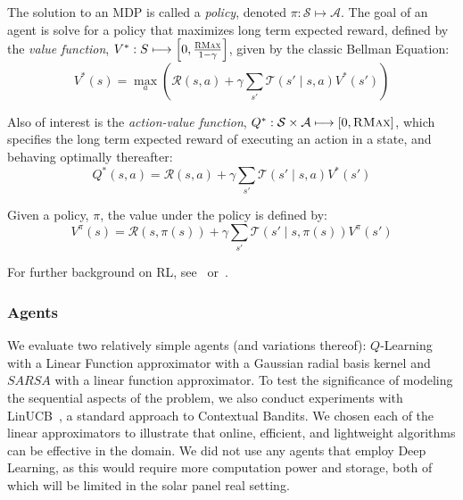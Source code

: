 \documentclass{article}
\newcommand{\mc}{\mathcal}
\begin{document}
{The solution to an MDP is called a {\it policy}, denoted $\pi : \mc{S} \longmapsto \mc{A}$. The goal of an agent is solve for a policy that maximizes long term expected reward, defined by the {\it value function}, $V^* : S \longmapsto \left[0,\frac{\textsc{RMax}}{1-\gamma}\right]$, given by the classic Bellman Equation:
\begin{equation}
V^*(s) = \max_a \left(\mc{R}(s,a) + \gamma \sum_{s'} \mc{T}(s' \mid s, a) V^*(s') \right)
\end{equation}

Also of interest is the {\it action-value function}, $Q^*: \mc{S} \times \mc{A} \longmapsto [0,\textsc{RMax}]$, which specifies the long term expected reward of executing an action in a state, and behaving optimally thereafter:
\begin{equation}
Q^*(s,a) = \mc{R}(s,a) + \gamma \sum_{s'} \mc{T}(s' \mid s,a) V^*(s')
\end{equation}

Given a policy, $\pi$, the value under the policy is defined by:
\begin{equation}
V^\pi(s) = \mc{R}(s, \pi(s)) + \gamma \sum_{s'} \mc{T}(s' \mid s, \pi(s)) V^\pi(s')
\end{equation}

For further background on RL, see~\citet{sutton1998reinforcement} or~\citet{kaelbling1996reinforcement}.

\subsubsection{Agents}
We evaluate two relatively simple agents (and variations thereof): $Q$-Learning with a Linear Function approximator with a Gaussian radial basis kernel and $SARSA$ with a linear function approximator. To test the significance of modeling the sequential aspects of the problem, we also conduct experiments with LinUCB~\cite{li2010contextual}, a standard approach to Contextual Bandits. We chosen each of the linear approximators to illustrate that online, efficient, and lightweight algorithms can be effective in the domain. We did not use any agents that employ Deep Learning, as this would require more computation power and storage, both of which will be limited in the solar panel real setting. 

}
\end{document}
